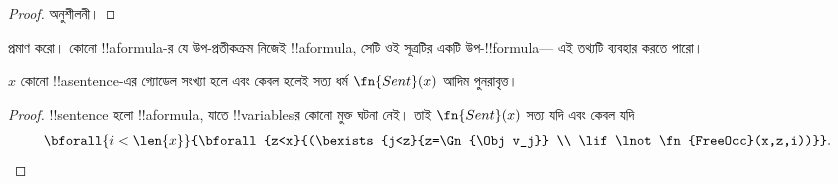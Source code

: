 \documentclass[../../../include/open-logic-section]{subfiles}
\begin{document}
\begin{proof}
অনুশীলনী।
\end{proof}

\begin{prob}
 প্রমাণ করো। কোনো !!a{formula}-র
যে উপ-প্রতীকক্রম নিজেই !!a{formula}, সেটি ওই সূত্রটির একটি উপ-!!{formula}—
এই তথ্যটি ব্যবহার করতে পারো।
\end{prob}

\begin{prop}
$x$ কোনো !!a{sentence}-এর গ্যোডেল সংখ্যা হলে এবং কেবল হলেই সত্য ধর্ম
$\fn{Sent}(x)$ আদিম পুনরাবৃত্ত।
\end{prop}

\begin{proof}
!!{sentence} হলো !!a{formula}, যাতে !!{variable}sর কোনো মুক্ত ঘটনা নেই।
তাই $\fn{Sent}(x)$ সত্য যদি এবং কেবল যদি
\begin{multline*}
\bforall{i<\len{x}}{\bforall{z<x}{(\bexists{j<z}{z=\Gn{\Obj v_j}} \\
\lif \lnot\fn{FreeOcc}(x,z,i))}}.
\end{multline*}
\end{proof}
\end{document}
